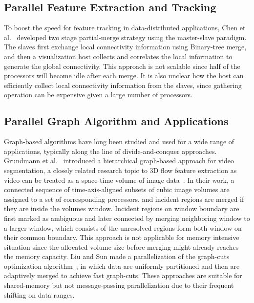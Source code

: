 \subsection{Parallel Feature Extraction and Tracking}

To boost the speed for feature tracking in data-distributed applications, Chen et al.~\cite{Chen03realtime} developed two stage partial-merge strategy using the master-slave paradigm. The slaves first exchange local connectivity information using Binary-tree merge, and then a visualization host collects and correlates the local information to generate the global connectivity. This approach is not scalable since half of the processors will become idle after each merge. It is also unclear how the host can efficiently collect local connectivity information from the slaves, since gathering operation can be expensive given a large number of processors.

\subsection{Parallel Graph Algorithm and Applications}

Graph-based algorithms have long been studied and used for a wide range of applications, typically along the line of divide-and-conquer approaches. Grundmann et al.~\cite{36247} introduced a hierarchical graph-based approach for video segmentation, a closely related research topic to 3D flow feature extraction as video can be treated as a space-time volume of image data~\cite{Klein2002}. In their work, a connected sequence of time-axis-aligned subsets of cubic image volumes are assigned to a set of corresponding processors, and incident regions are merged if they are inside the volumes window. Incident regions on window boundary are first marked as ambiguous and later connected by merging neighboring window to a larger window, which consists of the unresolved regions form both window on their common boundary. This approach is not applicable for memory intensive situation since the allocated volume size before merging might already reaches the memory capacity. Liu and Sun \cite{Liu2010} made a parallelization of the graph-cuts optimization algorithm~\cite{Boykov2004}, in which data are uniformly partitioned and then are adaptively merged to achieve fast graph-cuts. These approaches are suitable for shared-memory but not message-passing parallelization due to their frequent shifting on data ranges.
